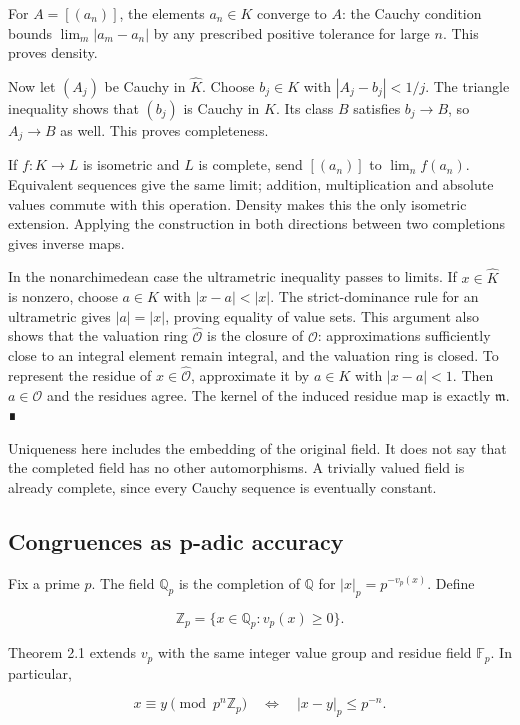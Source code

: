 \documentclass[
  english,
  11pt,
  a4paper,
]{article}
\begin{document}
For \(A=[(a_n)]\), the elements \(a_n\in K\) converge to \(A\): the
Cauchy condition bounds \(\lim_m|a_m-a_n|\) by any prescribed positive
tolerance for large \(n\). This proves density.

Now let \((A_j)\) be Cauchy in \(\widehat K\). Choose \(b_j\in K\) with
\(|A_j-b_j|<1/j\). The triangle inequality shows that \((b_j)\) is
Cauchy in \(K\). Its class \(B\) satisfies \(b_j\to B\), so \(A_j\to B\)
as well. This proves completeness.

If \(f:K\to L\) is isometric and \(L\) is complete, send \([(a_n)]\) to
\(\lim_n f(a_n)\). Equivalent sequences give the same limit; addition,
multiplication and absolute values commute with this operation. Density
makes this the only isometric extension. Applying the construction in
both directions between two completions gives inverse maps.

In the nonarchimedean case the ultrametric inequality passes to limits.
If \(x\in\widehat K\) is nonzero, choose \(a\in K\) with \(|x-a|<|x|\).
The strict-dominance rule for an ultrametric gives \(|a|=|x|\), proving
equality of value sets. This argument also shows that the valuation ring
\(\widehat{\mathcal O}\) is the closure of \(\mathcal O\):
approximations sufficiently close to an integral element remain
integral, and the valuation ring is closed. To represent the residue of
\(x\in\widehat{\mathcal O}\), approximate it by \(a\in K\) with
\(|x-a|<1\). Then \(a\in\mathcal O\) and the residues agree. The kernel
of the induced residue map is exactly \(\mathfrak m\). ∎

Uniqueness here includes the embedding of the original field. It does
not say that the completed field has no other automorphisms. A trivially
valued field is already complete, since every Cauchy sequence is
eventually constant.

\subsection{Congruences as p-adic
accuracy}\label{NT-LOC-02--congruences-as-p-adic-accuracy}

Fix a prime \(p\). The field \(\mathbb Q_p\) is the completion of
\(\mathbb Q\) for \(|x|_p=p^{-v_p(x)}\). Define

\[\mathbb Z_p=\{x\in\mathbb Q_p:v_p(x)\ge0\}.\]

Theorem 2.1 extends \(v_p\) with the same integer value group and
residue field \(\mathbb F_p\). In particular,

\[x\equiv y\pmod{p^n\mathbb Z_p}
\quad\Longleftrightarrow\quad |x-y|_p\le p^{-n}.\]
\end{document}

